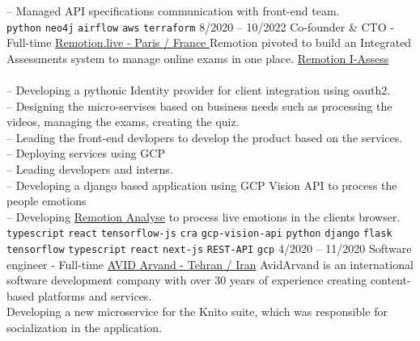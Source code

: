 \begin{entrylist}
{        -- Managed API specifications communication with front-end team. \\
        \texttt{python}\slashsep
        \texttt{neo4j}\slashsep
        \texttt{airflow}\slashsep
        \texttt{aws}\slashsep
        \texttt{terraform}
    }
    \entry
    {8/2020 -- 10/2022}
    {Co-founder \& CTO - Full-time}
    {\href{https://remotion.live/}{Remotion.live - Paris / France }}
    {Remotion pivoted to build an Integrated Assessments system to manage online exams in one place.
        \href{https://remotion.live/} {Remotion I-Assess} \\\\
        -- Developing a pythonic Identity provider for client integration using oauth2. \\
        -- Designing the micro-servises based on business needs such as processing the videos, managing the exams, creating the quiz. \\
        -- Leading the front-end devlopers to develop the product based on the services. \\
        -- Deploying services using GCP \\
        -- Leading developers and interns. \\
        -- Developing a django based application using GCP Vision API to process the people emotions \\
        -- Developing \href{https://analyse.remotion.live/} {Remotion Analyse} to process live emotions in the clients browser. \\
        \texttt{typescript}\slashsep
        \texttt{react}\slashsep
        \texttt{tensorflow-js}\slashsep
        \texttt{cra}\slashsep
        \texttt{gcp-vision-api}\slashsep
        \texttt{python}\slashsep
        \texttt{django}\slashsep
        \texttt{flask}\slashsep
        \texttt{tensorflow}\slashsep
        \texttt{typescript}\slashsep
        \texttt{react}\slashsep
        \texttt{next-js}\slashsep
        \texttt{REST-API}\slashsep
        \texttt{gcp}\slashsep
    }
    \entry
    {4/2020 -- 11/2020}
    {Software engineer - Full-time}
    {
        \href{https://www.linkedin.com/company/avid-technology-development/}{AVID Arvand - Tehran / Iran}}
    {
        AvidArvand is an international software development company with over 30 years of experience creating content-based platforms and services. \\
        Developing a new microservice for the Knito suite, which was responsible for socialization in the application.\\
}
\end{entrylist}
